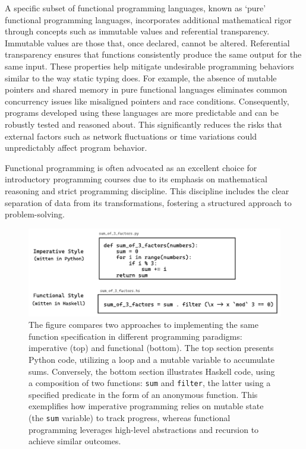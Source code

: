  A specific subset of functional programming languages, known as `pure' functional programming languages, incorporates additional mathematical rigor through concepts such as immutable values and referential transparency. Immutable values are those that, once declared, cannot be altered. Referential transparency ensures that functions consistently produce the same output for the same input. These properties help mitigate undesirable programming behaviors similar to the way static typing does. For example, the absence of mutable pointers and shared memory in pure functional languages eliminates common concurrency issues like misaligned pointers and race conditions. Consequently, programs developed using these languages are more predictable and can be robustly tested and reasoned about. This significantly reduces the risks that external factors such as network fluctuations or time variations could unpredictably affect program behavior.

Functional programming is often advocated as an excellent choice for introductory programming courses due to its emphasis on mathematical reasoning and strict programming discipline. This discipline includes the clear separation of data from its transformations, fostering a structured approach to problem-solving.


\begin{figure}[hbt]
  \includegraphics[width=\linewidth]{ImperativeFunctional}
  \caption{
    \label{fig:imperative-vs-functional}
    The figure compares two approaches to implementing the same function specification in different programming paradigms: imperative (top) and functional (bottom). The top section presents Python code, utilizing a loop and a mutable variable to accumulate sums. Conversely, the bottom section illustrates Haskell code, using a composition of two functions: \texttt{sum} and \texttt{filter}, the latter using a specified predicate in the form of an anonymous function. This exemplifies how imperative programming relies on mutable state (the \texttt{sum} variable) to track progress, whereas functional programming leverages high-level abstractions and recursion to achieve similar outcomes.    
    }
\end{figure}



